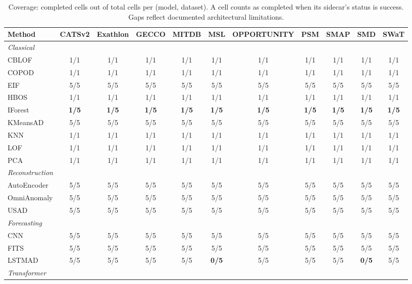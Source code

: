 \begin{table}[t]
\centering
\small
\caption{Coverage: completed cells out of total cells per (model, dataset). A cell counts as completed when its sidecar's status is success. Gaps reflect documented architectural limitations.}
\label{tab:coverage}
\begin{tabular}{lcccccccccc}
\toprule
Method & CATSv2 & Exathlon & GECCO & MITDB & MSL & OPPORTUNITY & PSM & SMAP & SMD & SWaT \\
\midrule
\multicolumn{11}{l}{\textit{Classical}} \\
CBLOF & 1/1 & 1/1 & 1/1 & 1/1 & 1/1 & 1/1 & 1/1 & 1/1 & 1/1 & 1/1 \\
COPOD & 1/1 & 1/1 & 1/1 & 1/1 & 1/1 & 1/1 & 1/1 & 1/1 & 1/1 & 1/1 \\
EIF & 5/5 & 5/5 & 5/5 & 5/5 & 5/5 & 5/5 & 5/5 & 5/5 & 5/5 & 5/5 \\
HBOS & 1/1 & 1/1 & 1/1 & 1/1 & 1/1 & 1/1 & 1/1 & 1/1 & 1/1 & 1/1 \\
IForest & \textbf{1/5} & \textbf{1/5} & \textbf{1/5} & \textbf{1/5} & \textbf{1/5} & \textbf{1/5} & \textbf{1/5} & \textbf{1/5} & \textbf{1/5} & \textbf{1/5} \\
KMeansAD & 5/5 & 5/5 & 5/5 & 5/5 & 5/5 & 5/5 & 5/5 & 5/5 & 5/5 & 5/5 \\
KNN & 1/1 & 1/1 & 1/1 & 1/1 & 1/1 & 1/1 & 1/1 & 1/1 & 1/1 & 1/1 \\
LOF & 1/1 & 1/1 & 1/1 & 1/1 & 1/1 & 1/1 & 1/1 & 1/1 & 1/1 & 1/1 \\
PCA & 1/1 & 1/1 & 1/1 & 1/1 & 1/1 & 1/1 & 1/1 & 1/1 & 1/1 & 1/1 \\
\midrule
\multicolumn{11}{l}{\textit{Reconstruction}} \\
AutoEncoder & 5/5 & 5/5 & 5/5 & 5/5 & 5/5 & 5/5 & 5/5 & 5/5 & 5/5 & 5/5 \\
OmniAnomaly & 5/5 & 5/5 & 5/5 & 5/5 & 5/5 & 5/5 & 5/5 & 5/5 & 5/5 & 5/5 \\
USAD & 5/5 & 5/5 & 5/5 & 5/5 & 5/5 & 5/5 & 5/5 & 5/5 & 5/5 & 5/5 \\
\midrule
\multicolumn{11}{l}{\textit{Forecasting}} \\
CNN & 5/5 & 5/5 & 5/5 & 5/5 & 5/5 & 5/5 & 5/5 & 5/5 & 5/5 & 5/5 \\
FITS & 5/5 & 5/5 & 5/5 & 5/5 & 5/5 & 5/5 & 5/5 & 5/5 & 5/5 & 5/5 \\
LSTMAD & 5/5 & 5/5 & 5/5 & 5/5 & \textbf{0/5} & 5/5 & 5/5 & 5/5 & \textbf{0/5} & 5/5 \\
\midrule
\multicolumn{11}{l}{\textit{Transformer}} \\

\end{tabular}
\end{table}
